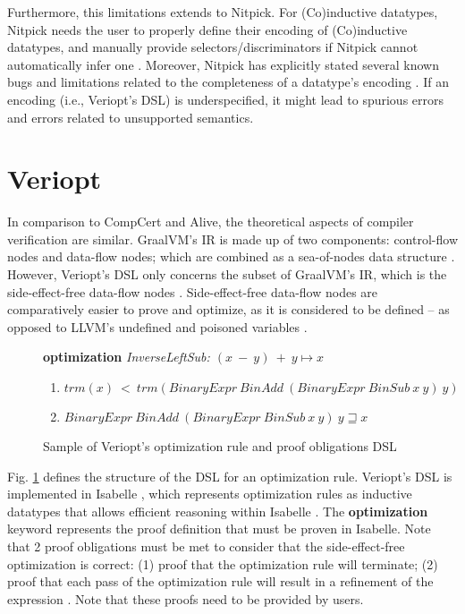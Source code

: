 Furthermore, this limitations extends to Nitpick. For (Co)inductive datatypes, Nitpick needs the user to 
properly define their encoding of (Co)inductive datatypes, and manually provide selectors/discriminators if Nitpick cannot automatically infer 
one \cite[Sec. 5.4]{isabelleProof}. Moreover, Nitpick has explicitly stated several known bugs and limitations related to the completeness 
of a datatype's encoding \cite[Ch. 8]{isabelleNitpick}. If an encoding (i.e., Veriopt's DSL) is underspecified, it might lead to spurious errors 
and errors related to unsupported semantics.

\section{Veriopt}
\label{sec:Veriopt}

In comparison to CompCert and Alive, the theoretical aspects of compiler verification are similar. GraalVM's IR is made up of two components: 
control-flow nodes and data-flow nodes; which are combined as a sea-of-nodes data structure \cite{ATVA21_GraalVM_IR_Semantics}. However, 
Veriopt's DSL only concerns the subset of GraalVM's IR, which is the side-effect-free data-flow nodes \cite{Term_Graph_Optimizations}.
Side-effect-free data-flow nodes are comparatively easier to prove and optimize, as it is considered to be defined -- as opposed to LLVM's undefined 
and poisoned variables \cite{Alive2}.

\begin{figure}[!htb]
    \textbf{optimization} \emph{InverseLeftSub: \((x\ -\ y)\ +\ y \longmapsto x\)}
    \begin{enumerate}
        \item \(trm(x)\ <\ trm(BinaryExpr\ BinAdd\ (BinaryExpr\ BinSub\ x\ y)\ y)\)
        \item \(BinaryExpr\ BinAdd\ (BinaryExpr\ BinSub\ x\ y)\ y \sqsupseteq x\)
    \end{enumerate}

    \caption{Sample of Veriopt's optimization rule and proof obligations DSL \cite[Fig. 3]{Term_Graph_Optimizations}}
    \label{fig:VerioptDSLSample}
\end{figure}

Fig. \ref{fig:VerioptDSLSample} defines the structure of the DSL for an optimization rule. Veriopt's DSL is implemented in Isabelle 
\cite{IsabelleHOL}, which represents optimization rules as inductive datatypes that allows efficient reasoning within Isabelle 
\cite[Sec. 3]{ATVA21_GraalVM_IR_Semantics} \cite{biendarra_ning_2024}. 
The \textbf{optimization} keyword represents the proof definition that must be proven in Isabelle. 
Note that 2 proof obligations must be met to consider that the side-effect-free optimization is correct: 
(1) proof that the optimization rule will terminate; (2) proof that each pass of the optimization rule will 
result in a refinement of the expression \cite{Term_Graph_Optimizations}. Note that these proofs need to be provided by users.

